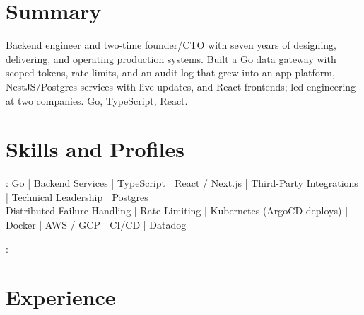 \documentclass[print]{jack-resume}
\begin{document}
\pagecolor{darkmodeBackground}


\begin{minipage}[t][1cm][t]{.03\textwidth}
    \hfill
\end{minipage}

\section{Summary}
Backend engineer and two-time founder/CTO with seven years of designing, delivering, and operating production systems. Built a Go data gateway with scoped tokens, rate limits, and an audit log that grew into an app platform, NestJS/Postgres services with live updates, and React frontends; led engineering at two companies. Go, TypeScript, React.
\sectionsep

\section{Skills and Profiles}
:
Go \hfill | \hfill
Backend Services \hfill | \hfill
TypeScript \hfill | \hfill
React / Next.js \hfill | \hfill
Third-Party Integrations \hfill | \hfill
Technical Leadership \hfill | \hfill
Postgres \\
\hspace{1.0cm} Distributed Failure Handling \hfill | \hfill
Rate Limiting \hfill | \hfill
Kubernetes (ArgoCD deploys) \hfill | \hfill
Docker \hfill | \hfill
AWS / GCP \hfill | \hfill
CI/CD \hfill | \hfill
Datadog \\

\raggedright{
    :
      \href{https://www.linkedin.com/in/jack-sturtevant/}{ \ExternalLink} |
     \href{https://github.com/jacksturt}{ \ExternalLink}}

\section{Experience}
\end{document}
